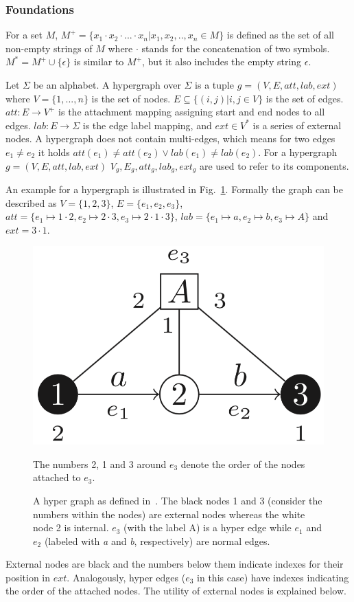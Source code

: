 \subsubsection{Foundations}

For a set $M$, $M^+=\{x_1 \cdot x_2 \cdot ... \cdot x_n | x_1,x_2,..,x_n \in M \}$ is defined as the set of all non-empty strings of $M$ where $\cdot$ stands for the concatenation of two symbols.
$M^*=M^+ \cup \{ \epsilon \} $ is similar to $M^+$, but it also includes the empty string $\epsilon$.

Let $\Sigma$ be an alphabet. A hypergraph over $\Sigma$ is a tuple $g=(V,E,att,lab,ext)$ where $V=\{1,...,n\}$ is the set of nodes. $E \subseteq \{(i,j) | i,j\in V\} $ is the set of edges. $att: E \to V^+$ is the attachment mapping assigning start and end nodes to all edges. $lab: E\to \Sigma$ is the edge label mapping, and $ext \in V^*$ is a series of external nodes. A hypergraph does not contain multi-edges, which means for two edges $e_1\not=e_2$ it holds $att(e_1)\not=att(e_2) \vee lab(e_1)\not=lab(e_2)$. For a hypergraph $g=(V,E,att,lab,ext)$  $V_g, E_g, att_g, lab_g, ext_g$ are used to refer to its components.

An example for a hypergraph is illustrated in Fig.~\ref{fig:hypergraph}. Formally the graph can be described as $V=\{1,2,3\}$, $E=\{e_1,e_2,e_3\}$, $att=\{e_1 \mapsto 1 \cdot 2, e_2 \mapsto2 \cdot 3, e_3 \mapsto 2 \cdot 1 \cdot 3 \}$, $lab=\{ e_1\mapsto a, e_2 \mapsto b, e_3 \mapsto A \}$ and $ext=3 \cdot 1$.

\begin{figure}
	\centering
	\includegraphics[width=0.3\linewidth]{figures/relatedwork/hypergraph}
	\caption{A hyper graph as defined in~\cite{maneth}. The black nodes 1 and 3 (consider the numbers within the nodes) are external nodes whereas the white node 2 is internal. $e_3$ (with the label A) is a hyper edge while $e_1$ and $e_2$ (labeled with \textit{a} and \textit{b}, respectively) are normal edges.} The numbers 2, 1 and 3 around $e_3$ denote the order of the nodes attached to $e_3$.
	\label{fig:hypergraph}
\end{figure}

External nodes are black and the numbers below them indicate indexes for their position in $ext$. Analogously,  hyper edges ($e_3$ in this case) have indexes indicating the order of the attached nodes. The utility of external nodes is explained below.~\cite{maneth}

